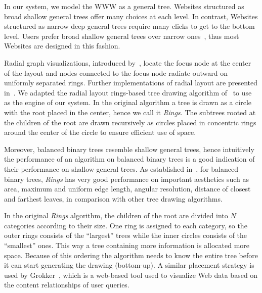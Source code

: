 \documentclass[]{article}
\begin{document}
{%
In our system, we model the WWW as a general tree.
Websites structured as broad shallow general trees offer many choices at each level.
In contrast, Websites structured as narrow deep general trees require many clicks to get to the bottom level.
Users prefer broad shallow general trees over narrow ones~\cite{mw-04}, thus most Websites are designed in this fashion.

Radial graph visualizations, introduced by~\cite{dett-gd-99, e-92}, locate the focus node at the center of the layout 
and nodes connected to the focus node radiate outward on uniformly separated rings.
Further implementations of radial layout are presented in~\cite{km-03, sz-00, yfdh-01}.
We adapted the radial layout rings-based tree drawing algorithm of~\cite{tm02} to use as the engine of our system.
In the original algorithm a tree is drawn as a circle with the root placed in the center, hence we call it {\em Rings}.
The subtrees rooted at the children of the root are drawn recursively as circles placed in concentric rings around the 
center of the circle to ensure efficient use of space.

Moreover, balanced binary trees resemble shallow general trees, hence intuitively the performance of an algorithm on
balanced binary trees is a good indication of their performance on shallow general trees.
As established in~\cite{rjsc-06}, for balanced binary trees, {\em Rings} has very good performance on important aesthetics such as area, maximum and uniform edge length, angular resolution, distance of closest and farthest leaves, in comparison with other tree drawing algorithms.

In the original {\em Rings} algorithm, the children of the root are divided into $N$ categories according to their size.  
One ring is assigned to each category, so the outer rings consists of the ``largest'' trees while the inner circles consists of the ``smallest'' ones.  
This way a tree containing more information is allocated more space.
Because of this ordering the algorithm needs to know the entire tree before it can start generating the drawing (bottom-up).
A similar placement strategy is used by Grokker~\cite{grokker}, which is a web-based tool used to visualize Web data based on the content relationships of user queries.

}
\end{document}
